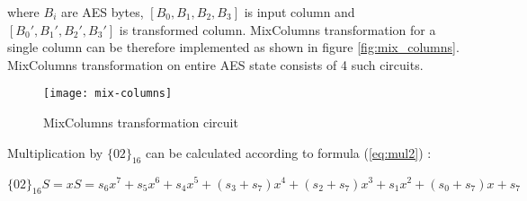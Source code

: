 where $B_i$ are AES bytes, $[B_0, B_1, B_2, B_3]$ is input column and $[B_0', B_1', B_2', B_3']$ is transformed column. MixColumns transformation for a single column can be therefore implemented as shown in figure \ref{fig:mix_columns}. MixColumns transformation on entire AES state consists of 4 such circuits.

\begin{figure}[!h]
\label{fig:missingfigure}

\centering
\texttt{[image: mix-columns]}

\caption{MixColumns transformation circuit}
\end{figure}

Multiplication by $\{02\}_{16}$ can be calculated according to formula (\ref{eq:mul2}) \cite{vlsi}: 

\begin{equation}
\label{eq:mul2}
\{02\}_{16}S = xS = s_6x^7 + s_5x^6 + s_4x^5 + (s_3 + s_7)x^4 + (s_2 + s_7)x^3 + s_1x^2 + (s_0 + s_7)x + s_7
\end{equation}


